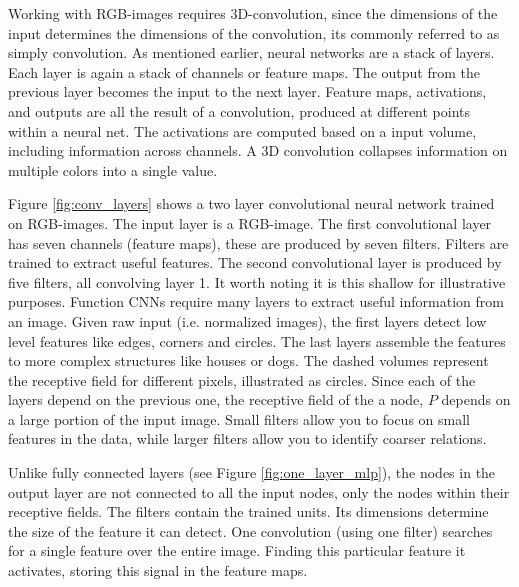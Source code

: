 \documentclass{article}
\begin{document}
Working with RGB-images requires 3D-convolution, since the dimensions of the input determines the dimensions of the convolution, its commonly referred to as simply convolution. As mentioned earlier, neural networks are a stack of layers. Each layer is again a stack of channels or feature maps. The output from the previous layer becomes the input to the next layer. Feature maps, activations, and outputs are all the result of a convolution, produced at different points within a neural net. The activations are computed based on a input volume, including information across channels. A 3D convolution collapses information on multiple colors into a single value.

Figure \ref{fig:conv_layers} shows a two layer convolutional neural network trained on RGB-images. The input layer is a RGB-image. The first convolutional layer has seven channels (feature maps), these are produced by seven filters. Filters are trained to extract useful features. The second convolutional layer is produced by five filters, all convolving layer 1. It worth noting it is this shallow for illustrative purposes. Function CNNs require many layers to extract useful information from an image. %
Given raw input (i.e. normalized images), the first layers detect low level features like edges, corners and circles. The last layers assemble the features to more complex structures like houses or dogs. The dashed volumes represent the receptive field for different pixels, illustrated as circles. Since each of the layers depend on the previous one, the receptive field of the a node, $P$ depends on a large portion of the input image. Small filters allow you to focus on small features in the data, while larger filters allow you to identify coarser relations. 

Unlike fully connected layers (see Figure \ref{fig:one_layer_mlp}), the nodes in the output layer are not connected to all the input nodes, only the nodes within their receptive fields. The filters contain the trained units. Its dimensions determine the size of the feature it can detect. One convolution (using one filter) searches for a single feature over the entire image. Finding this particular feature it activates, storing this signal in the feature maps.%
\end{document}
